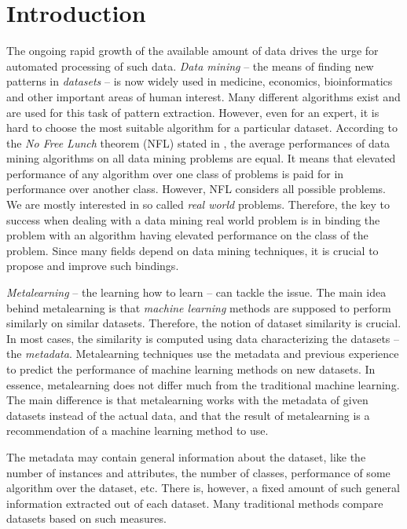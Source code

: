 \chapter{Introduction}
The ongoing rapid growth of the available amount of data drives the urge for automated processing of such data.
\emph{Data mining} -- the means of finding new patterns in \emph{datasets} -- is now widely used in medicine, economics, bioinformatics and other important areas of human interest. Many different algorithms exist and are used for this task of pattern extraction. However, even for an expert, it is hard to choose the most suitable algorithm for a particular dataset. 
According to the \emph{No Free Lunch} theorem (NFL) stated in \cite{NoFreeLunchTheorem}, the average performances of data mining algorithms on all data mining problems are equal. It means that elevated performance of any algorithm over one class of problems is paid for in performance over another class. However, NFL considers all possible problems. We are mostly interested in so called \emph{real world} problems. Therefore, the key to success when dealing with a data mining real world problem is in binding the problem with an algorithm having elevated performance on the class of the problem. Since many fields depend on data mining techniques, it is crucial to propose and improve such bindings.

\emph{Metalearning} \cite{BrazdilMetalearning-2009} -- the learning how to learn -- can tackle the issue. 
The main idea behind metalearning is that \emph{machine learning} methods are supposed to perform similarly on similar datasets. Therefore, the notion of dataset similarity is crucial. In most cases, the similarity is computed using data characterizing the datasets -- the \emph{metadata}. Metalearning techniques use the metadata and previous experience to predict the performance of machine learning methods on new datasets. In essence, metalearning does not differ much from the traditional machine learning. The main difference is that metalearning works with the metadata of given datasets instead of the actual data, and that the result of metalearning is a recommendation of a machine learning method to use. 

The metadata may contain general information about the dataset, like the number of instances and attributes, the number of classes, performance of some algorithm over the dataset, etc. There is, however, a fixed amount of such general information extracted out of each dataset.  Many traditional methods compare datasets based on such measures.

